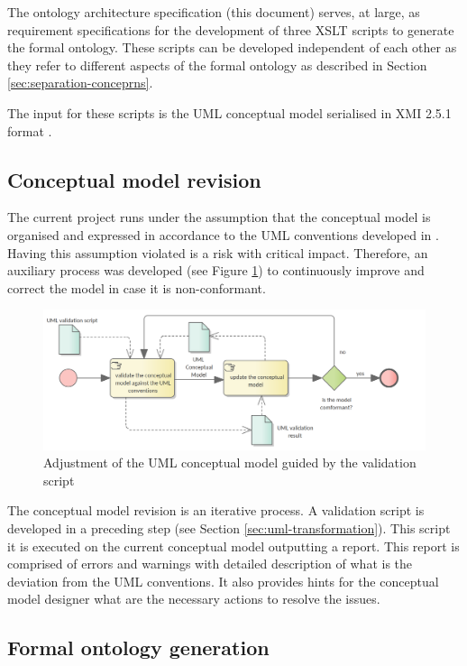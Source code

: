 	The ontology architecture specification (this document) serves, at large, as requirement specifications for the development of three XSLT scripts to generate the formal ontology. These scripts can be developed independent of each other as they refer to different aspects of the formal ontology as described in Section \ref{sec:separation-conceprns}.
	
	The input for these scripts is the UML conceptual model serialised in XMI 2.5.1 format \cite{xmi2.5.1}.
	
	\subsection{Conceptual model revision}
	\label{sec:revision-cm}
	
	The current project runs under the assumption that the conceptual model is organised and expressed in accordance to the UML conventions developed in \citet{costetchi2020b}. Having this assumption violated is a risk with critical impact. Therefore, an auxiliary process was developed (see Figure \ref{fig:revision-cm}) to continuously improve and correct the model in case it is non-conformant. 
	
	\begin{figure}[!ht]	
		\centering
		\includegraphics[width=.85\textwidth]{../img/conceptualModelRevision.png}
		\caption{Adjustment of the UML conceptual model guided by the validation script}
		\label{fig:revision-cm}
	\end{figure}

	The conceptual model revision is an iterative process. A validation script is developed in a preceding step (see Section \ref{sec:uml-transformation}). This script it is executed on the current conceptual model outputting a report. This report is comprised of errors and warnings with detailed description of what is the deviation from the UML conventions. It also provides hints for the conceptual model designer what are the necessary actions to resolve the issues.
	
	\subsection{Formal ontology generation}
	\label{sec:ontology-generation}
	
